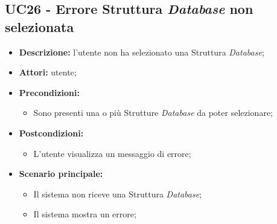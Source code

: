 \subsection{UC26 - Errore Struttura \textit{Database} non selezionata}
\label{sec:UC26}
\begin{itemize}
	\item \textbf{Descrizione:} l’utente non ha selezionato una Struttura \textit{Database};
	\item \textbf{Attori:} utente;
	\item \textbf{Precondizioni:}
	\begin{itemize}
		\item Sono presenti una o più Strutture \textit{Database} da poter selezionare;
	\end{itemize}
	\item \textbf{Postcondizioni:}
	\begin{itemize}
		\item L’utente visualizza un messaggio di errore;
	\end{itemize}
	\item \textbf{Scenario principale:}
	\begin{itemize}
		\item Il sistema non riceve una Struttura \textit{Database};
		\item Il sistema mostra un errore;
	\end{itemize}
\end{itemize}

